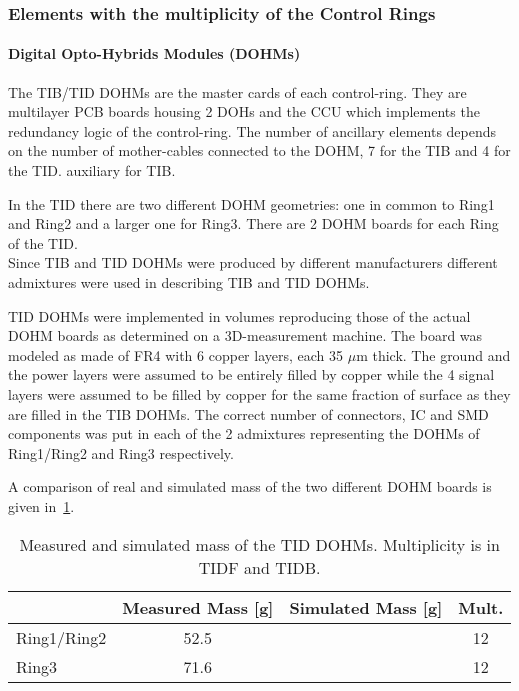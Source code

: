 \documentclass{cmspaper}
\begin{document}
\subsubsection{Elements with the multiplicity of the Control Rings}
\paragraph{Digital Opto-Hybrids Modules (DOHMs)}
The TIB/TID DOHMs are the master cards of each control-ring. They are
multilayer PCB boards housing 2 DOHs and the CCU which implements the
redundancy logic of the control-ring.
The number of ancillary elements depends on the number of
mother-cables connected to the DOHM, 7 for the TIB  and 4 for
the TID. \fixme auxiliary for TIB.

In the TID there are two different DOHM geometries: one in common to Ring1 and
Ring2 and a larger one for Ring3.
There are 2 DOHM boards for each Ring of the TID.\\
Since TIB and TID DOHMs were produced by different manufacturers
different admixtures were used in describing TIB and TID DOHMs.

TID DOHMs were implemented in volumes reproducing those of the actual
DOHM boards as determined on a 3D-measurement machine.
The board was modeled as made of FR4 with 6 copper layers, each 35
$\mu$m thick. The ground and the power layers were assumed to be entirely filled by
copper while the 4 signal layers were assumed to be filled by copper
for the same fraction of surface as they are filled in the TIB DOHMs. 
The correct number of connectors, IC and SMD components was put in
each of the 2 admixtures representing the DOHMs of Ring1/Ring2 and Ring3 respectively.

A comparison of real and simulated mass of the two different DOHM
boards is given in~\ref{tab:tid_dohm}.
\begin{table}[h!]
  \caption{Measured and simulated mass of the TID DOHMs.  Multiplicity is in TIDF and TIDB.}
  \label{tab:tid_dohm}
  \begin{center}
    \begin{tabular}{lccc}
      & Measured Mass [g] & Simulated Mass [g] & Mult.\\
      \hline
      Ring1/Ring2 & 52.5 & & 12 \\
      Ring3       & 71.6 & & 12 \\
      \hline
    \end{tabular}
  \end{center}
\end{table}
\end{document}
